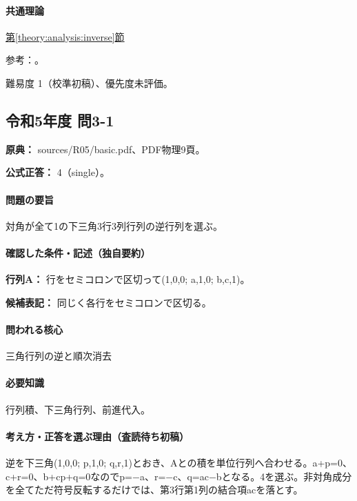 \paragraph{共通理論} \hyperref[theory:analysis:inverse]{第\ref*{theory:analysis:inverse}節}

\par 参考：\cite{mit_inverse2007}。

\par 難易度 1（校準初稿）、優先度未評価。

\subsection{令和5年度 問3-1}
\label{q:r05-reg-basic-3-1}

\noindent\textbf{原典：} sources/R05/basic.pdf、PDF物理9頁。

\textbf{公式正答：} 4（single）。

\paragraph{問題の要旨} 対角が全て1の下三角3行3列行列の逆行列を選ぶ。

\paragraph{確認した条件・記述（独自要約）}\mbox{}\par

\noindent\textbf{行列A：} 行をセミコロンで区切って(1,0,0; a,1,0; b,c,1)。\par

\noindent\textbf{候補表記：} 同じく各行をセミコロンで区切る。\par

\paragraph{問われる核心} 三角行列の逆と順次消去

\paragraph{必要知識} 行列積、下三角行列、前進代入。

\paragraph{考え方・正答を選ぶ理由（査読待ち初稿）} 逆を下三角(1,0,0; p,1,0; q,r,1)とおき、Aとの積を単位行列へ合わせる。a+p=\allowbreak{}0、c+r=\allowbreak{}0、b+cp+q=\allowbreak{}0なのでp=−a、r=−c、q=\allowbreak{}ac−bとなる。4を選ぶ。非対角成分を全てただ符号反転するだけでは、第3行第1列の結合項acを落とす。

